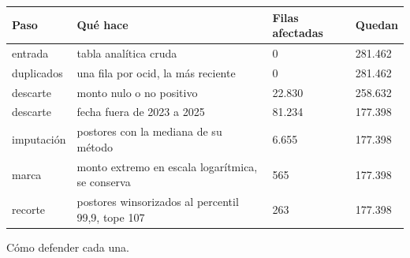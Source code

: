 \documentclass[11pt]{article}
\begin{document}
\begin{center}\footnotesize
\begin{tabularx}{\linewidth}{Q{0.620}Q{2.096}Q{0.733}Q{0.550}}
\toprule
\textbf{Paso} & \textbf{Qué hace} & \textbf{Filas afectadas} & \textbf{Quedan} \\
\midrule
entrada & tabla analítica cruda & 0 & 281.462 \\
duplicados & una fila por ocid, la más reciente & 0 & 281.462 \\
descarte & monto nulo o no positivo & 22.830 & 258.632 \\
descarte & fecha fuera de 2023 a 2025 & 81.234 & 177.398 \\
imputación & postores con la mediana de su método & 6.655 & 177.398 \\
marca & monto extremo en escala logarítmica, se conserva & 565 & 177.398 \\
recorte & postores winsorizados al percentil 99,9, tope 107 & 263 & 177.398 \\
\bottomrule
\end{tabularx}
\end{center}
Cómo defender cada una.
\end{document}
